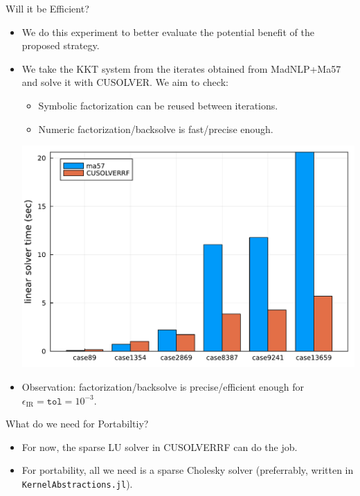 \begin{frame}{Will it be Efficient?}
  \begin{itemize}
  \item We do this experiment to better evaluate the potential benefit of the proposed strategy.
  \item We take the KKT system from the iterates obtained from MadNLP+Ma57 and solve it with CUSOLVER. We aim to check:
    \begin{itemize}
    \item Symbolic factorization can be reused between iterations.
    \item Numeric factorization/backsolve is fast/precise enough. 
    \end{itemize}
    \begin{center}
      \includegraphics[width=.5\textwidth]{../fig/hypo.pdf}  
    \end{center}
  \item Observation: factorization/backsolve is precise/efficient enough for $\epsilon_{\text{IR}}=\texttt{tol} = 10^{-3}$.
  \end{itemize}
\end{frame}

\begin{frame}{What do we need for Portabiltiy?}
  \begin{itemize}
  \item For now, the sparse LU solver in CUSOLVERRF can do the job.
  \item For portability, all we need is a sparse Cholesky solver (preferrably, written in {\tt KernelAbstractions.jl}).
  \end{itemize}
\end{frame}


